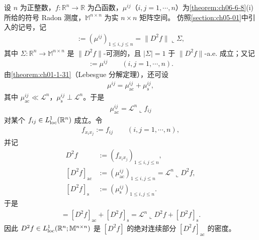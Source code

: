 \documentclass[../../main.tex]{subfiles}%
\begin{document}
\begin{definition*}[二阶导数的测度记号]\label{definition:ch06-def-6-8-记号}
设 $n$ 为正整数，$f:\mathbb{R}^n\to\mathbb{R}$ 为凸函数，$\mu^{ij}$（$i,j=1,\cdots,n$）为\cref{theorem:ch06-6-8}(i) 所给的符号 Radon 测度，$\mathbb{M}^{n\times n}$ 为实 $n\times n$ 矩阵空间。%
仿照\cref{section:ch05-01}中引入的记号，记%
\begin{align*}
[D^{2}f]:=(\mu^{ij})_{1\leqslant i,j\leqslant n}=\lVert D^{2}f\rVert\llcorner\Sigma,
\end{align*}
其中 $\Sigma:\mathbb{R}^n\to\mathbb{M}^{n\times n}$ 是 $\lVert D^{2}f\rVert$-可测的，且 $\lvert\Sigma\rvert=1$ 于 $\lVert D^{2}f\rVert$-a.e. 成立；又记
\begin{align*}
[f_{x_ix_j}]:=\mu^{ij}\qquad(i,j=1,\cdots,n).
\end{align*}
由\cref{theorem:ch01-1-31}（Lebesgue 分解定理），还可设%
\begin{align*}
\mu^{ij}=\mu^{ij}_{\mathrm{ac}}+\mu^{ij}_{\mathrm{s}},
\end{align*}
其中 $\mu^{ij}_{\mathrm{ac}}\ll\mathcal{L}^{n}$，$\mu^{ij}_{\mathrm{s}}\perp\mathcal{L}^{n}$。于是
\begin{align*}
\mu^{ij}_{\mathrm{ac}}=\mathcal{L}^{n}\llcorner f_{ij}
\end{align*}
对某个 $f_{ij}\in L^{1}_{\mathrm{loc}}(\mathbb{R}^n)$ 成立。令
\begin{align*}
f_{x_ix_j}:=f_{ij}\qquad(i,j=1,\cdots,n),
\end{align*}
并记
\begin{align*}
D^{2}f&:=(f_{x_ix_j})_{1\leqslant i,j\leqslant n},\\
[D^{2}f]_{\mathrm{ac}}&:=(\mu^{ij}_{\mathrm{ac}})_{1\leqslant i,j\leqslant n}=\mathcal{L}^{n}\llcorner D^{2}f,\\
[D^{2}f]_{\mathrm{s}}&:=(\mu^{ij}_{\mathrm{s}})_{1\leqslant i,j\leqslant n}.
\end{align*}
于是
\begin{align*}
[D^{2}f]=[D^{2}f]_{\mathrm{ac}}+[D^{2}f]_{\mathrm{s}}=\mathcal{L}^{n}\llcorner D^{2}f+[D^{2}f]_{\mathrm{s}}.
\end{align*}
因此 $D^{2}f\in L^{1}_{\mathrm{loc}}(\mathbb{R}^{n};\mathbb{M}^{n\times n})$ 是 $[D^{2}f]$ 的绝对连续部分 $[D^{2}f]_{\mathrm{ac}}$ 的密度。
\end{definition*}
\end{document}
